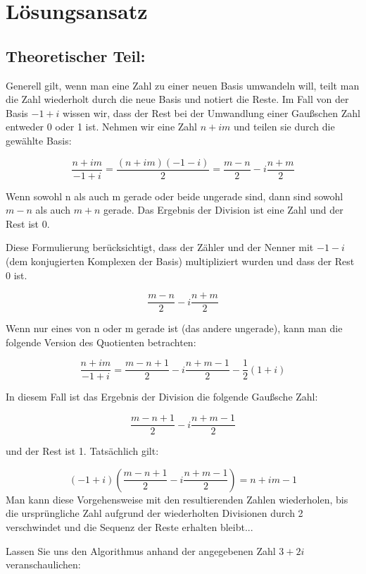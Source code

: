 \documentclass[course=erap]{aspdoc}
\begin{document}
    \section{Lösungsansatz}

    \subsection{Theoretischer Teil:}
    Generell gilt, wenn man eine Zahl zu einer neuen Basis umwandeln will, teilt man die Zahl wiederholt durch die neue Basis und notiert die Reste.
    Im Fall von der Basis $-1+i$ wissen wir, dass der Rest bei der Umwandlung einer Gaußschen Zahl entweder 0 oder 1 ist.\cite{complex_base_conversion}
    \newpage
    Nehmen wir eine Zahl $n + im$ und teilen sie durch die gewählte Basis:

    \[\frac{{n + im}}{{-1 + i}} = \frac{{(n + im)(-1 - i)}}{2} = \frac{{m - n}}{2} - i\frac{{n + m}}{2}\]

    Wenn sowohl n als auch m gerade oder beide ungerade sind, dann sind sowohl $m-n$ als auch $m+n$ gerade. Das Ergebnis der Division ist eine Zahl und der Rest ist 0.

    Diese Formulierung berücksichtigt, dass der Zähler und der Nenner mit $-1-i$  (dem konjugierten Komplexen der Basis) multipliziert wurden und dass der Rest 0 ist.

    \[\frac{{m - n}}{{2}} - i\frac{{n + m}}{2}\]

    Wenn nur eines von n oder m gerade ist (das andere ungerade), kann man die folgende Version des Quotienten betrachten:

    \[\frac{{n + im}}{{-1 + i}} = \frac{{m - n + 1}}{2} - i \frac{{n + m -1}}{2} - \frac{{1}}{2}(1 + i)\]

    In diesem Fall ist das Ergebnis der Division die folgende Gaußsche Zahl:

    \[\frac{{m - n + 1}}{{2}} - i\frac{{n + m - 1}}{2}\]

    und der Rest ist 1. Tatsächlich gilt:

    \[(-1 +i) (\frac{m - n + 1}{2} - i \frac{n + m - 1}{2}) = n +im - 1\]
    Man kann diese Vorgehensweise mit den resultierenden Zahlen wiederholen, bis die ursprüngliche Zahl aufgrund der wiederholten Divisionen durch 2 verschwindet und die Sequenz der Reste erhalten bleibt...
    \newline

    Lassen Sie uns den Algorithmus anhand der angegebenen Zahl $3 + 2i$ veranschaulichen:
\end{document}
